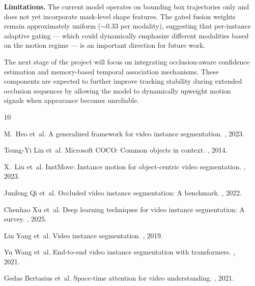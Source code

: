 \documentclass{article}
\begin{document}
\textbf{Limitations.} The current model operates on bounding box trajectories only and does not yet incorporate mask-level shape features. The gated fusion weights remain approximately uniform ($\sim$0.33 per modality), suggesting that per-instance adaptive gating --- which could dynamically emphasize different modalities based on the motion regime --- is an important direction for future work.

The next stage of the project will focus on integrating occlusion-aware confidence estimation and memory-based temporal association mechanisms. These components are expected to further improve tracking stability during extended occlusion sequences by allowing the model to dynamically upweight motion signals when appearance becomes unreliable.

\clearpage

{\small


\begin{thebibliography}{10}

M.~Heo et~al.
\newblock A generalized framework for video instance segmentation.
, 2023.

Tsung-Yi Lin et~al.
\newblock Microsoft COCO: Common objects in context.
, 2014.

X.~Liu et~al.
\newblock InstMove: Instance motion for object-centric video segmentation.
, 2023.

Junfeng Qi et~al.
\newblock Occluded video instance segmentation: A benchmark.
, 2022.

Chenhao Xu et~al.
\newblock Deep learning techniques for video instance segmentation: A survey.
, 2025.

Lin Yang et~al.
\newblock Video instance segmentation.
, 2019.

Yu Wang et~al.
\newblock End-to-end video instance segmentation with transformers.
, 2021.

Gedas Bertasius et~al.
\newblock Space-time attention for video understanding.
, 2021.

\end{thebibliography}
}
\end{document}
